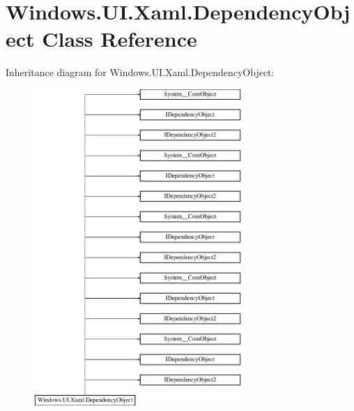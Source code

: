 \hypertarget{class_windows_1_1_u_i_1_1_xaml_1_1_dependency_object}{}\section{Windows.\+U\+I.\+Xaml.\+Dependency\+Object Class Reference}
\label{class_windows_1_1_u_i_1_1_xaml_1_1_dependency_object}
Inheritance diagram for Windows.\+U\+I.\+Xaml.\+Dependency\+Object\+:\begin{figure}[H]
\begin{center}
\leavevmode
\includegraphics[height=12.000000cm]{class_windows_1_1_u_i_1_1_xaml_1_1_dependency_object}
\end{center}
\end{figure}

